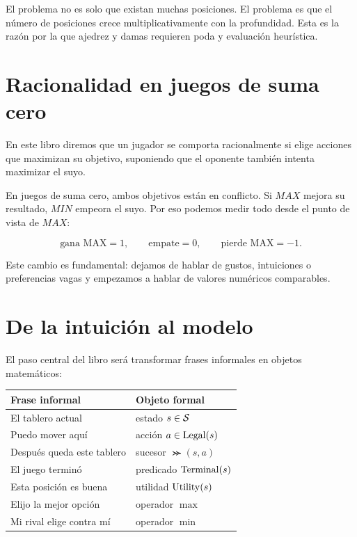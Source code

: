 \begin{warningbox}
El problema no es solo que existan muchas posiciones. El problema es que el número de posiciones crece multiplicativamente con la profundidad. Esta es la razón por la que ajedrez y damas requieren poda y evaluación heurística.
\end{warningbox}

\section{Racionalidad en juegos de suma cero}

En este libro diremos que un jugador se comporta racionalmente si elige acciones que maximizan su objetivo, suponiendo que el oponente también intenta maximizar el suyo.

En juegos de suma cero, ambos objetivos están en conflicto. Si $MAX$ mejora su resultado, $MIN$ empeora el suyo. Por eso podemos medir todo desde el punto de vista de $MAX$:

\[
\text{gana MAX}=1,\qquad \text{empate}=0,\qquad \text{pierde MAX}=-1.
\]

\begin{formalbox}
Este cambio es fundamental: dejamos de hablar de gustos, intuiciones o preferencias vagas y empezamos a hablar de valores numéricos comparables.
\end{formalbox}

\section{De la intuición al modelo}

El paso central del libro será transformar frases informales en objetos matemáticos:

\begin{center}
\begin{tabular}{ll}
\toprule
Frase informal & Objeto formal\\
\midrule
El tablero actual & estado $s\in\mathcal{S}$\\
Puedo mover aquí & acción $a\in\operatorname{Legal}(s)$\\
Después queda este tablero & sucesor $\Succ(s,a)$\\
El juego terminó & predicado $\operatorname{Terminal}(s)$\\
Esta posición es buena & utilidad $\operatorname{Utility}(s)$\\
Elijo la mejor opción & operador $\max$\\
Mi rival elige contra mí & operador $\min$\\
\bottomrule
\end{tabular}
\end{center}


